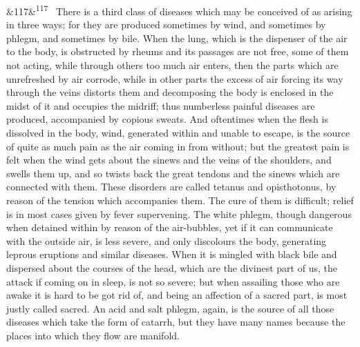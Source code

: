 \documentclass[12pt]{article}
\newcommand{\para}[1][]{\par\noindent\ifx&#1&\else\textsuperscript{\footnotesize #1}~\fi}
\begin{document}
\para[117] There is a third class of diseases which may be conceived of as arising in three ways; for they are produced sometimes by wind, and sometimes by phlegm, and sometimes by bile. When the lung, which is the dispenser of the air to the body, is obstructed by rheums and its passages are not free, some of them not acting, while through others too much air enters, then the parts which are unrefreshed by air corrode, while in other parts the excess of air forcing its way through the veins distorts them and decomposing the body is enclosed in the midst of it and occupies the midriff; thus numberless painful diseases are produced, accompanied by copious sweats. And oftentimes when the flesh is dissolved in the body, wind, generated within and unable to escape, is the source of quite as much pain as the air coming in from without; but the greatest pain is felt when the wind gets about the sinews and the veins of the shoulders, and swells them up, and so twists back the great tendons and the sinews which are connected with them. These disorders are called tetanus and opisthotonus, by reason of the tension which accompanies them. The cure of them is difficult; relief is in most cases given by fever supervening. The white phlegm, though dangerous when detained within by reason of the air-bubbles, yet if it can communicate with the outside air, is less severe, and only discolours the body, generating leprous eruptions and similar diseases. When it is mingled with black bile and dispersed about the courses of the head, which are the divinest part of us, the attack if coming on in sleep, is not so severe; but when assailing those who are awake it is hard to be got rid of, and being an affection of a sacred part, is most justly called sacred. An acid and salt phlegm, again, is the source of all those diseases which take the form of catarrh, but they have many names because the places into which they flow are manifold.
\end{document}
